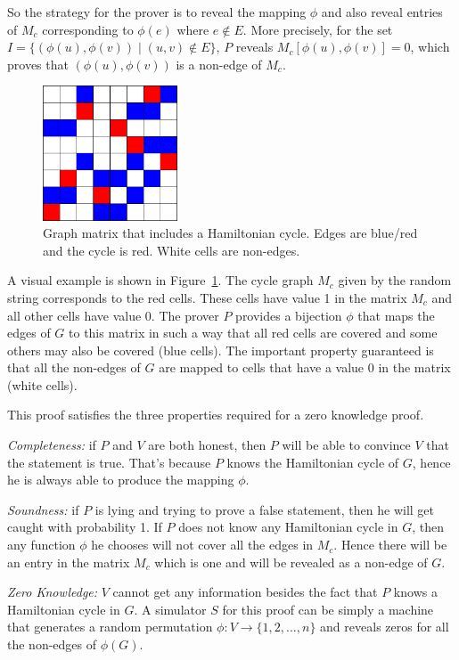 So the strategy for the prover is to reveal the mapping $\phi$ and also reveal entries of $M_c$ corresponding to $\phi(e)$ where $e \notin E$. More precisely, for the set
$I=\{(\phi(u),\phi(v)) \mid (u,v)\notin E\}$, $P$ reveals
$M_c[\phi(u),\phi(v)]=0$,
which proves that $(\phi(u),\phi(v))$ is a non-edge of $M_c$.

\begin{figure}[ht]
	\centering
		\includegraphics[height=4cm]{red_blue.png}
	\caption{Graph matrix that includes a Hamiltonian cycle. Edges are blue/red and the
                 cycle is red. White cells are non-edges.}
	\label{fig:red_blue}
\end{figure}

A visual example is shown in Figure~\ref{fig:red_blue}. The cycle graph $M_c$ given by the
random string corresponds to the red cells. These cells have value 1 in the matrix $M_c$ and
all other cells have value 0. The prover $P$ provides a bijection $\phi$ that
maps the edges of $G$ to this matrix in such a way that all red cells are covered and
some others may also be covered (blue cells). The important property guaranteed is that
all the non-edges of $G$ are mapped to cells that have a value 0 in the matrix (white cells).

This proof satisfies the three properties required for a zero knowledge proof.

\textit{Completeness:} if $P$ and $V$ are both honest, then $P$ will be able to convince
$V$ that the statement is true. That's because $P$ knows the Hamiltonian cycle of $G$,
hence he is always able to produce the mapping $\phi$.

\textit{Soundness:} if $P$ is lying and trying to prove a false statement, then he will
get caught with probability 1. If $P$ does not know any Hamiltonian cycle in $G$, then
any function $\phi$ he chooses will not cover all the edges in $M_c$. Hence there will
be an entry in the matrix $M_c$ which is one and will be revealed as a non-edge of $G$.

\textit{Zero Knowledge:} $V$ cannot get any information besides the fact that $P$
knows a Hamiltonian cycle in $G$. A simulator $S$ for this proof can be simply a machine
that generates a random permutation $\phi:V\rightarrow \{1,2,\ldots,n\}$ and reveals zeros
for all the non-edges of $\phi(G)$.


